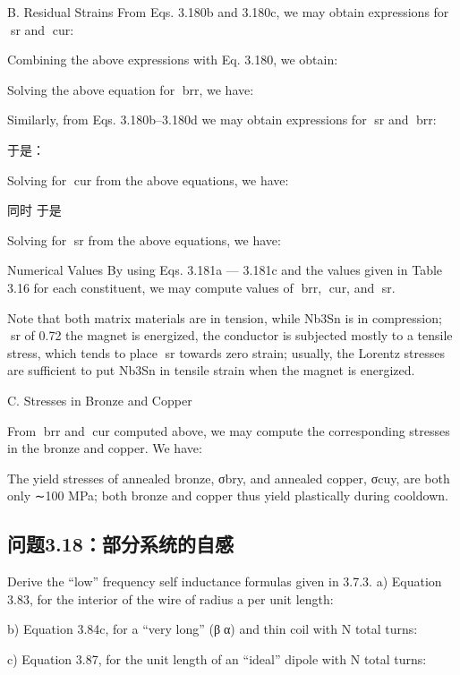 B. Residual Strains
From Eqs. 3.180b and 3.180c, we may obtain expressions for sr and cur:

Combining the above expressions with Eq. 3.180, we obtain:

Solving the above equation for brr, we have:

Similarly, from Eqs. 3.180b–3.180d we may obtain expressions for sr and brr:


于是：

Solving for cur from the above equations, we have:

同时
于是

Solving for sr from the above equations, we have:

Numerical Values By using Eqs. 3.181a — 3.181c and the values given in Table
3.16 for each constituent, we may compute values of brr, cur, and sr.

Note that both matrix materials are in tension, while Nb3Sn is in compression; sr
of 0.72%
the magnet is energized, the conductor is subjected mostly to a tensile stress, which
tends to place sr towards zero strain; usually, the Lorentz stresses are sufficient
to put Nb3Sn in tensile strain when the magnet is energized.

C. Stresses in Bronze and Copper

From brr and cur computed above, we may compute the corresponding stresses
in the bronze and copper. We have:

The yield stresses of annealed bronze, σbry, and annealed copper, σcuy, are both
only ∼100 MPa; both bronze and copper thus yield plastically during cooldown.


\newpage



\subsection{问题3.18：部分系统的自感}
Derive the “low” frequency self inductance formulas given in 3.7.3.
a) Equation 3.83, for the interior of the wire of radius a per unit length:

b) Equation 3.84c, for a “very long” (βα) and thin coil with N total turns:

c) Equation 3.87, for the unit length of an “ideal” dipole with N total turns:

